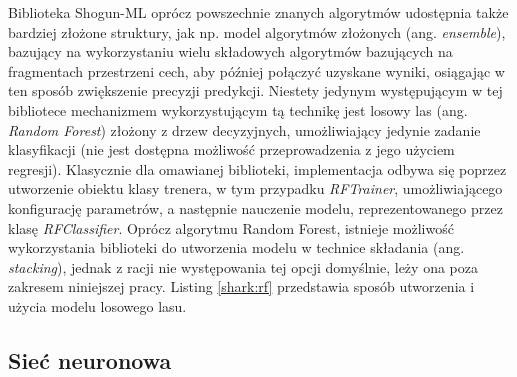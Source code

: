 Biblioteka Shogun-ML oprócz powszechnie znanych algorytmów udostępnia także bardziej złożone struktury, jak np. model algorytmów złożonych (ang. \textit{ensemble}), bazujący na wykorzystaniu wielu składowych algorytmów bazujących na fragmentach przestrzeni cech, aby później połączyć uzyskane wyniki, osiągając w ten sposób zwiększenie precyzji predykcji. Niestety jedynym występującym w tej bibliotece mechanizmem wykorzystującym tą technikę jest losowy las (ang. \textit{Random Forest}) złożony z drzew decyzyjnych, umożliwiający jedynie zadanie klasyfikacji (nie jest dostępna możliwość przeprowadzenia z jego użyciem regresji). Klasycznie dla omawianej biblioteki, implementacja odbywa się poprzez utworzenie obiektu klasy trenera, w tym przypadku \textit{RFTrainer}, umożliwiającego konfigurację parametrów, a następnie nauczenie modelu, reprezentowanego przez klasę \textit{RFClassifier}. Oprócz algorytmu Random Forest, istnieje możliwość wykorzystania biblioteki do utworzenia modelu w technice składania (ang. \textit{stacking}), jednak z racji nie występowania tej opcji domyślnie, leży ona poza zakresem niniejszej pracy. Listing \ref{shark:rf} przedstawia sposób utworzenia i użycia modelu losowego lasu.


\subsection{Sieć neuronowa}

